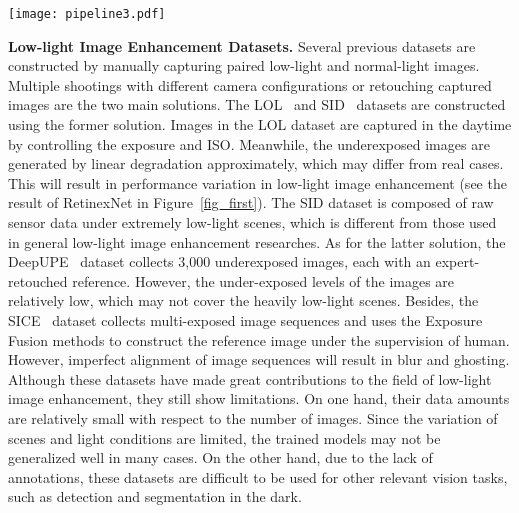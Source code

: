 \begin{figure*}[t]
	\begin{center}
		\texttt{[image: pipeline3.pdf]}
	\end{center}
	\caption{Pipeline of constructing the proposed low-light simulation dataset. Our method optimally selects normal exposed images from public datasets, performs low-light simulation, and adds noise to synthesize realistic low-light images. Meanwhile, the original normal exposed images are enhanced by exposure correction and contrast/details amplification, so as to generate high-quality reference images. Details can be found in Section~\ref{sec_dataset}.}
	\label{fig_process}
\end{figure*}

{\bf Low-light Image Enhancement Datasets.}
Several previous datasets are constructed by manually capturing paired low-light and normal-light images. Multiple shootings with different camera configurations or retouching captured images are the two main solutions.
The LOL~\cite{Chen2018Retinex} and SID~\cite{seedark2018cvpr} datasets are constructed using the former solution.
Images in the LOL dataset are captured in the daytime by controlling the exposure and ISO. Meanwhile, the underexposed images are generated by linear degradation approximately, which may differ from real cases. This will result in performance variation in low-light image enhancement (see the result of RetinexNet in Figure~\ref{fig_first}). The SID dataset is composed of raw sensor data under extremely low-light scenes, which is different from those used in general low-light image enhancement researches.
As for the latter solution, the DeepUPE~\cite{wang2019underexposed} dataset collects 3,000 underexposed images, each with an expert-retouched reference. However, the under-exposed levels of the images are relatively low, which may not cover the heavily low-light scenes. Besides, the SICE~\cite{Cai2018deep} dataset collects multi-exposed image sequences and uses the Exposure Fusion methods to construct the reference image under the supervision of human. However, imperfect alignment of image sequences will result in blur and ghosting.
Although these datasets have made great contributions to the field of low-light image enhancement, they still show limitations.
On one hand, their data amounts are relatively small with respect to the number of images. Since the variation of scenes and light conditions are limited, the trained models may not be generalized well in many cases.
On the other hand, due to the lack of annotations, these datasets are difficult to be used for other relevant vision tasks, such as detection and segmentation in the dark.

